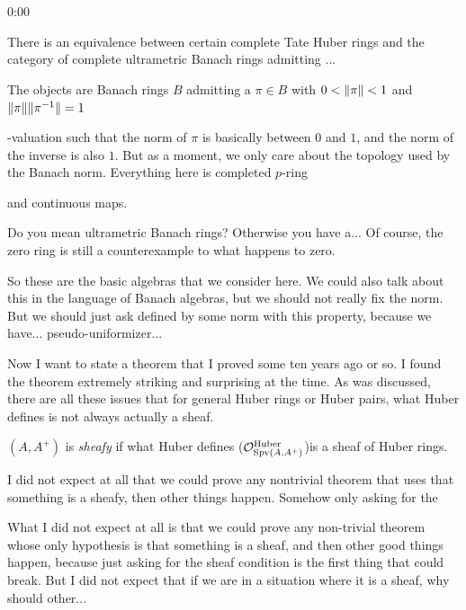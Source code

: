 \begin{unfinished}{0:00}
{%
There is an equivalence between certain complete Tate Huber rings and the category of complete ultrametric Banach rings admitting ...

The objects are Banach rings $B$ admitting a $\pi \in B$ with $0 < \| \pi \| < 1$ and $\| \pi \|\| \pi^{-1} \| = 1$

-valuation such that the norm of $\pi$ is basically between $0$ and $1$, and the norm of the inverse is also $1$. 
But as a moment, we only care about the topology used by the Banach norm. Everything here is completed $p$-ring 

 and continuous maps. 

\ques Do you mean ultrametric Banach rings? Otherwise you have a... Of course, the zero ring is still a counterexample to what happens to zero.

So these are the basic algebras that we consider here. We could also talk about this in the language of Banach algebras, but we should not really fix the norm. But we should just ask defined by some norm with this property, because we have... pseudo-uniformizer...

Now I want to state a theorem that I proved some ten years ago or so. I found the theorem extremely striking and surprising at the time.
As was discussed, there are all these issues that for general Huber rings or Huber pairs, what Huber defines is not always actually a sheaf.

%
\begin{definition}[Sheafy]
 $(A, A^+)$ is \emph{sheafy} if what Huber defines ($\mathcal O^{\mathrm{Huber}}_{\operatorname{Spv}(A, A^+)}$)is a sheaf of Huber rings.
\end{definition}

I did not expect at all that we could prove any nontrivial theorem that uses that something is a sheafy, then other things happen. Somehow only asking for the 


%
What I did not expect at all is that we could prove any non-trivial theorem whose only hypothesis is that something is a sheaf, and then other good things happen, because just asking for the sheaf condition is the first thing that could break.
 But I did not expect that if we are in a situation where it is a sheaf, why should other... 


}
\end{unfinished}

